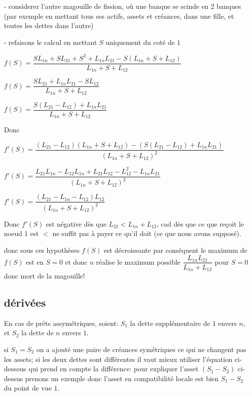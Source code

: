 \documentclass[11pt,oneside,twocolumn]{article}
\begin{document}
- considerer l'autre magouille de fission, où une banque se scinde en 2 banques (par exemple en mettant tous ses actifs, assets et créances, dans une fille, et toutes les dettes dans l'autre)

- refaisons le calcul en mettant $S$ uniquement du coté de $1$


$f(S) =
\dfrac
{SL_{1n}+SL_{21}+S^{2}+L_{1n}L_{21} - S(L_{1n}+S+L_{12})}
{L_{1n}+S+L_{12}}
$

$f(S) =
\dfrac
{SL_{21}+L_{1n}L_{21} - SL_{12}}
{L_{1n}+S+L_{12}}
$

$f(S) =
\dfrac
{S(L_{21} - L_{12})+L_{1n}L_{21}}
{L_{1n}+S+L_{12}}
$

Donc


$f'(S) =
\dfrac
{(L_{21} - L_{12})(L_{1n}+S+L_{12}) - (S(L_{21} - L_{12})+L_{1n}L_{21})}
{(L_{1n}+S+L_{12})^{2}}
$

$f'(S) =
\dfrac
{L_{21}L_{1n} - L_{12}L_{1n} + L_{21}L_{12} - L_{12}^{2} - L_{1n}L_{21}}
{(L_{1n}+S+L_{12})^{2}}
$

$f'(S) =
\dfrac
{(L_{21} - L_{1n} - L_{12})L_{12}}
{(L_{1n}+S+L_{12})^{2}}
$


Donc $f'(S)$ est négative dès que $L_{21} <  L_{1n} + L_{12}$,
cad dès que ce que reçoit le noeud 1 est $<$ ne suffit pas à
payer ce qu'il doit (ce que nous avons supposé).

donc sous ces hypothèses $f(S)$ est décroissante par conséquent le maximum de $f(S)$ est en $S = 0$ et donc $n$ réalise le maximum possible
$\dfrac
{L_{1n}L_{21}}
{L_{1n}+L_{12}}
$
pour $S=0$ donc mort de la magouille!


\subsection{dérivées}

En cas de prêts assymétriques, soient:
$S_{1}$ la dette supplémentaire de $1$ envers $n$, et
$S_{2}$ la dette de $n$ envers $1$.

si $S_1=S_2$ on a ajouté une paire de créances symétriques ce qui ne changent pas les assets; si les deux dettes sont différentes il vaut mieux utiliser l'équation ci-dessous qui prend en compte la différence:
pour expliquer l'asset $(S_{1}-S_2)$ ci-dessus
prenons un exemple
donc l'asset en compatibilité locale est bien $S_1-S_2$ du point de vue $1$.
\end{document}
